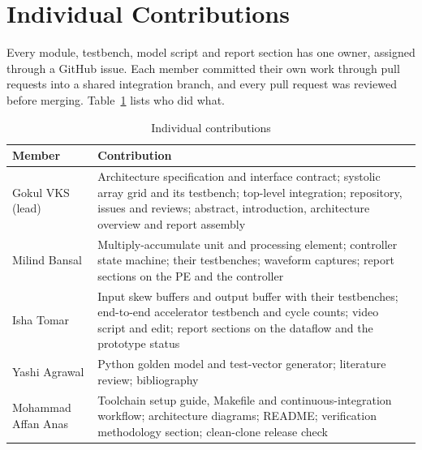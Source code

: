 
\section{Individual Contributions}
Every module, testbench, model script and report section has one owner, assigned through a GitHub issue. Each member committed their own work through pull requests into a shared integration branch, and every pull request was reviewed before merging. Table~\ref{tab:contrib} lists who did what.

\begin{table}[ht]
\centering
\caption{Individual contributions}
\label{tab:contrib}
\footnotesize
\begin{tabular}{@{}>{\raggedright\arraybackslash}p{}>{\raggedright\arraybackslash}p{}@{}}
\toprule
Member & Contribution \\
\midrule
Gokul VKS (lead) & Architecture specification and interface contract; systolic array grid and its testbench; top-level integration; repository, issues and reviews; abstract, introduction, architecture overview and report assembly \\
\addlinespace
Milind Bansal & Multiply-accumulate unit and processing element; controller state machine; their testbenches; waveform captures; report sections on the PE and the controller \\
\addlinespace
Isha Tomar & Input skew buffers and output buffer with their testbenches; end-to-end accelerator testbench and cycle counts; video script and edit; report sections on the dataflow and the prototype status \\
\addlinespace
Yashi Agrawal & Python golden model and test-vector generator; literature review; bibliography \\
\addlinespace
Mohammad Affan Anas & Toolchain setup guide, Makefile and continuous-integration workflow; architecture diagrams; README; verification methodology section; clean-clone release check \\
\bottomrule
\end{tabular}
\end{table}
